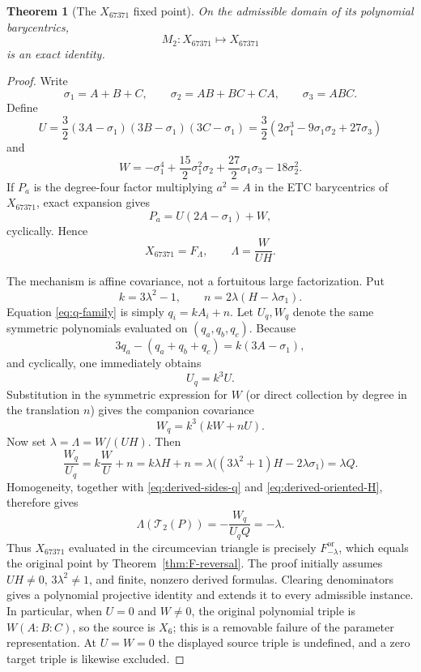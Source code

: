 \documentclass[11pt]{article}
\newtheorem{theorem}{Theorem}
\newcommand{\Circ}{\mathcal T_2}
\begin{document}
\begin{theorem}[The $X_{67371}$ fixed point]\label{thm:x67371}
On the admissible domain of its polynomial barycentrics,
\[
 M_2:X_{67371}\mapsto X_{67371}
\]
is an exact identity.
\end{theorem}
\begin{proof}
Write
\[
 \sigma_1=A+B+C,\qquad \sigma_2=AB+BC+CA,
 \qquad \sigma_3=ABC.
\]
Define
\[
 U=\frac32(3A-\sigma_1)(3B-\sigma_1)(3C-\sigma_1)
   =\frac32(2\sigma_1^3-9\sigma_1\sigma_2+27\sigma_3)
\]
and
\[
 W=-\sigma_1^4+\frac{15}{2}\sigma_1^2\sigma_2
   +\frac{27}{2}\sigma_1\sigma_3-18\sigma_2^2.
\]
If $P_a$ is the degree-four factor multiplying $a^2=A$ in the ETC
barycentrics of $X_{67371}$, exact expansion gives
\[
 P_a=U(2A-\sigma_1)+W,
\]
cyclically.  Hence
\begin{equation}\label{eq:x67371-lambda}
 X_{67371}=F_\Lambda,\qquad \Lambda=\frac{W}{UH}.
\end{equation}

The mechanism is affine covariance, not a fortuitous large
factorization.  Put
\[
 k=3\lambda^2-1,\qquad n=2\lambda(H-\lambda\sigma_1).
\]
Equation \eqref{eq:q-family} is simply $q_i=kA_i+n$.  Let $U_q,W_q$
denote the same symmetric polynomials evaluated on $(q_a,q_b,q_c)$.
Because
\[
 3q_a-(q_a+q_b+q_c)=k(3A-\sigma_1),
\]
and cyclically, one immediately obtains
\begin{equation}\label{eq:x67371-affine-U}
 U_q=k^3U.
\end{equation}
Substitution in the symmetric expression for $W$ (or direct collection by
degree in the translation $n$) gives the companion covariance
\begin{equation}\label{eq:x67371-affine-W}
 W_q=k^3(kW+nU).
\end{equation}
Now set $\lambda=\Lambda=W/(UH)$.  Then
\[
 \frac{W_q}{U_q}=k\frac WU+n=k\lambda H+n
 =\lambda\bigl((3\lambda^2+1)H-2\lambda\sigma_1\bigr)
 =\lambda Q.
\]
Homogeneity, together with \eqref{eq:derived-sides-q} and
\eqref{eq:derived-oriented-H}, therefore gives
\[
 \Lambda(\Circ(P))
 =-\frac{W_q}{U_qQ}=-\lambda.
\]
Thus $X_{67371}$ evaluated in the circumcevian triangle is precisely
$F_{-\lambda}^{\mathrm{or}}$, which equals the original point by
Theorem~\ref{thm:F-reversal}.
The proof initially assumes $UH\ne0$, $3\lambda^2\ne1$, and finite,
nonzero derived formulas.  Clearing denominators gives a polynomial
projective identity and extends it to every admissible instance.  In
particular, when $U=0$ and $W\ne0$, the original polynomial triple is
$W(A:B:C)$, so the source is $X_6$; this is a removable failure of the
parameter representation.  At $U=W=0$ the displayed source triple is
undefined, and a zero target triple is likewise excluded.
\end{proof}
\end{document}
